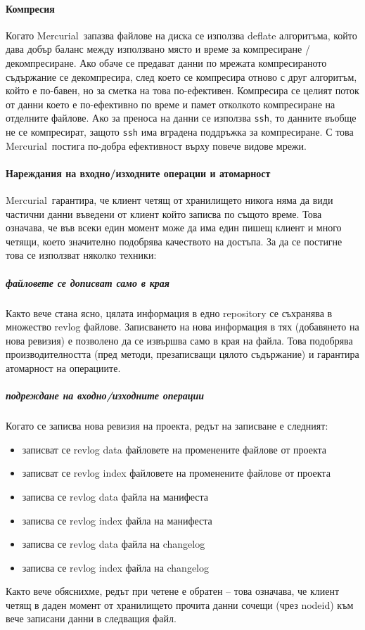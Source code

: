 \documentclass[a4paper]{article}
\def\Hg{Mercurial}
\begin{document}
    \paragraph{Компресия}
    Когато \Hg\ запазва файлове на диска се използва deflate\cite{deflate}
    алгоритъма, който дава добър баланс между използвано място и време за
    компресиране / декомпресиране. Ако обаче се предават данни по мрежата компресираното
    съдържание се декомпресира, след което се компресира отново с друг
    алгоритъм, който е по-бавен, но за сметка на това по-ефективен. Компресира се целият поток от
    данни което е по-ефективно по време и памет отколкото компресиране на отделните
    файлове. Ако за преноса на данни се използва \texttt{ssh}\cite{ssh}, то
    данните въобще не се компресират, защото \texttt{ssh} има вградена
    поддръжка за компресиране. С това \Hg\ постига по-добра ефективност върху
    повече видове мрежи.

    \paragraph{Нареждания на входно/изходните операции и атомарност}
    \Hg\ гарантира, че клиент четящ от хранилището никога няма да види
    частични данни въведени от клиент който записва по същото време. Това
    означава, че във всеки един момент може да има един пишещ клиент и много
    четящи, което значително подобрява качеството на достъпа. За да се постигне
    това се използват няколко техники:
      \subparagraph{файловете се дописват само в края}
      Както вече стана ясно, цялата информация в едно repository се съхранява
      в множество revlog файлове. Записването на нова информация в тях
      (добавянето на нова ревизия) е позволено да се извършва само в края на
      файла. Това подобрява производителността (пред методи, презаписващи цялото
      съдържание) и гарантира атомарност на операциите.

      \subparagraph{подреждане на входно/изходните операции}
      Когато се записва нова ревизия на проекта, редът на записване е следният:
      \begin{itemize}
        \item записват се revlog data файловете на променените файлове от проекта
        \item записват се revlog index файловете на променените файлове от проекта
        \item записва се revlog data файла на манифеста
        \item записва се revlog index файла на манифеста
        \item записва се revlog data файла на changelog
        \item записва се revlog index файла на changelog
      \end{itemize}
      Както вече обяснихме, редът при четене е обратен -- това означава, че
      клиент четящ в даден момент от хранилището прочита данни сочещи (чрез
      nodeid) към вече записани данни в следващия файл.
\end{document}
